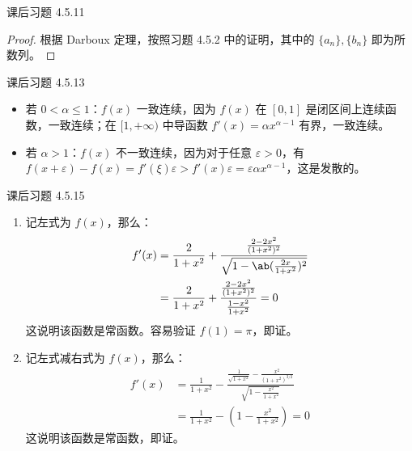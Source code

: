 \begin{problem}
	课后习题 4.5.11

	\begin{proof}
		根据 Darboux 定理，按照习题 4.5.2 中的证明，其中的 $\{a_n\}, \{b_n\}$ 即为所数列。
	\end{proof}
\end{problem}

\begin{problem}
	课后习题 4.5.13

	\begin{solution}
		\begin{itemize}
			\item 若 $0 < \alpha \le 1$：$f(x)$ 一致连续，因为 $f(x)$ 在 $[0, 1]$ 是闭区间上连续函数，一致连续；在 $[1, +\infty)$ 中导函数 $f'(x) = \alpha x^{\alpha - 1}$ 有界，一致连续。
			
			\item 若 $\alpha > 1$：$f(x)$ 不一致连续，因为对于任意 $\varepsilon > 0$，有 $f(x+\varepsilon) - f(x) = f'(\xi) \varepsilon > f'(x) \varepsilon = \varepsilon \alpha x^{\alpha - 1}$，这是发散的。
		\end{itemize}
	\end{solution}
\end{problem}

\begin{problem}
	课后习题 4.5.15

	\begin{solution}
		\begin{enumerate}
			\item[\textbf{2)}] 记左式为 $f(x)$，那么：
			$$
			\begin{aligned}
				f'(x) & = \frac{2}{1 + x^2} + \frac{\frac{2 - 2x^2}{(1 + x^2)^2}}{\sqrt{1 - \ab(\frac{2x}{1 + x^2})^2}} \\
				& = \frac{2}{1 + x^2} + \frac{\frac{2 - 2x^2}{(1 + x^2)^2}}{\frac{1 - x^2}{1 + x^2}} = 0
			\end{aligned}
			$$
			这说明该函数是常函数。容易验证 $f(1) = \pi$，即证。

			\item[\textbf{2)}] 记左式减右式为 $f(x)$，那么：
			$$
			\begin{aligned}
				f'(x) & = \frac{1}{1 + x^2} - \frac{\frac{1}{\sqrt{1 + x^2}} - \frac{x^2}{(1 + x^2)^{3/2}}}{\sqrt{1 - \frac{x^2}{1 + x^2}}} \\
				& = \frac{1}{1 + x^2} - (1 - \frac{x^2}{1 + x^2}) = 0
			\end{aligned}
			$$
			这说明该函数是常函数，即证。
		\end{enumerate}
	\end{solution}
\end{problem}

